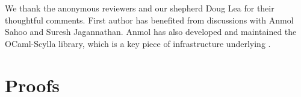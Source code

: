 \documentclass[sigplan,screen]{acmart}
\begin{document}




\maketitle
















\begin{acks}                            %
  We thank the anonymous reviewers and our shepherd Doug Lea for their
  thoughtful comments. First author has benefited from discussions
  with Anmol Sahoo and Suresh Jagannathan. Anmol has also developed
  and maintained the OCaml-Scylla library, which is a key piece of
  infrastructure underlying \quark.
\end{acks}



\appendix
\section{Proofs}




\end{document}
